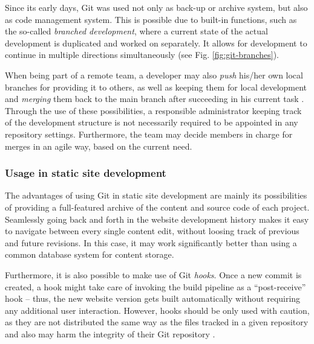 Since its early days, Git was used not only as back-up or archive system, but also as code management system. This is possible due to built-in functions, such as the so-called \emph{branched development}, where a current state of the actual development is duplicated and worked on separately. It allows for development to continue in multiple directions simultaneously \cite[89]{loeliger2012version} (see Fig. \ref{fig:git-branches}).

When being part of a remote team, a developer may also \emph{push} his/her own local branches for providing it to others, as well as keeping them for local development and \emph{merging} them back to the main branch after succeeding in his current task \cite[207]{dhillon2016}. Through the use of these possibilities, a responsible administrator keeping track of the development structure is not necessarily required to be appointed in any repository settings. Furthermore, the team may decide members in charge for merges in an agile way, based on the current need.

\subsubsection{Usage in static site development}
The advantages of using Git in static site development are mainly its possibilities of providing a full-featured archive of the content and source code of each project. Seamlessly going back and forth in the website development history makes it easy to navigate between every single content edit, without loosing track of previous and future revisions. In this case, it may work significantly better than using a common database system for content storage.

Furthermore, it is also possible to make use of Git \emph{hooks}. Once a new commit is created, a hook might take care of invoking the build pipeline as a ``post-receive'' hook -- thus, the new website version gets built automatically without requiring any additional user interaction. However, hooks should be only used with caution, as they are not distributed the same way as the files tracked in a given repository and also may harm the integrity of their Git repository \cite[p. 285f]{loeliger2012version}.
